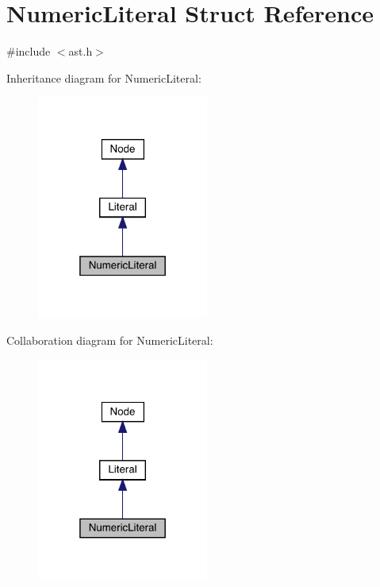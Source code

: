 \hypertarget{struct_numeric_literal}{}\section{Numeric\+Literal Struct Reference}
\label{struct_numeric_literal}


{\ttfamily \#include $<$ast.\+h$>$}



Inheritance diagram for Numeric\+Literal\+:
\nopagebreak
\begin{figure}[H]
\begin{center}
\leavevmode
\includegraphics[width=160pt]{struct_numeric_literal__inherit__graph}
\end{center}
\end{figure}


Collaboration diagram for Numeric\+Literal\+:
\nopagebreak
\begin{figure}[H]
\begin{center}
\leavevmode
\includegraphics[width=160pt]{struct_numeric_literal__coll__graph}
\end{center}
\end{figure}
